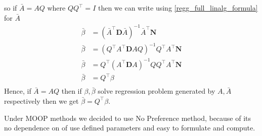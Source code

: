 \newline so if $\bar{A}=AQ$ where $QQ^\top = I$ then we can write using \ref{regg_full_linalg_formula} for $\bar{A}$
\begin{equation}
\begin{aligned} 
    \bar{\beta} &= (\bar{A}^\top \mathbf{D} \bar{A})^{-1} \bar{A}^\top \mathbf{N}\\
    \bar{\beta} &= (Q^\top A^\top \mathbf{D} AQ)^{-1} Q^\top A^\top \mathbf{N}\\
    \bar{\beta} &= Q^\top (A^\top \mathbf{D} A)^{-1} Q Q^\top A^\top \mathbf{N}\\
    \bar{\beta} &= Q^\top \beta\\
\end{aligned}
\end{equation}
Hence, if $\bar{A} = AQ$ then if $\beta, \bar{\beta}$ solve regression problem generated by $A, \bar{A}$ respectively then we get $\bar{\beta} = Q^\top\beta$. 

Under MOOP methods we decided to use No Preference method, because of its no dependence on of use defined parameters and easy to formulate and compute.

